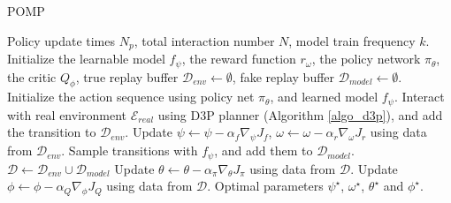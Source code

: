 \documentclass{article} %
\begin{document}
\begin{algorithm}[!thb]
\caption{POMP}
\label{algo_pomp}
\begin{algorithmic}[1]
    \REQUIRE Policy update times $N_p$, total interaction number $N$, model train frequency $k$.
    \STATE  Initialize the learnable model $f_\psi$, the reward function $r_{\omega}$, the policy network $\pi_\theta$, the critic $Q_{\phi}$, true replay buffer $\mathcal{D}_\textit{env} \leftarrow \emptyset$, fake replay buffer $\mathcal{D}_\textit{model} \leftarrow \emptyset$.
        \STATE Initialize the action sequence  using policy net $\pi_\theta$, and learned model $f_\psi$.
        \STATE Interact with real environment $\mathcal{E}_\textit{real}$ using D3P planner (Algorithm \ref{algo_d3p}), and add the transition
        to $\mathcal{D}_\textit{env}$.
        \REPEAT 
        \STATE Update $\psi \leftarrow \psi - \alpha_f \nabla_\psi J_f$, $\omega \leftarrow \omega - \alpha_r \nabla_\omega J_r$ using data from $\mathcal{D}_\textit{env} $.
        \ENDIF
        \STATE Sample transitions with $f_\psi$, and add them to $\mathcal{D}_\textit{model}$.
        \STATE $\mathcal{D} \leftarrow \mathcal{D}_\textit{env}   \cup \mathcal{D}_\textit{model}$
    \STATE Update $\theta \leftarrow \theta - \alpha_\pi \nabla_\theta J_\pi   $ using data from $\mathcal{D}$.
    \STATE Update $\phi \leftarrow \phi - \alpha_Q \nabla_\phi J_Q$ using data from $\mathcal{D}$.
    \ENDFOR 
    \ENDFOR
    \RETURN Optimal parameters $\psi^\star$, $\omega^\star$, $\theta^\star$ and $\phi^\star$.
\end{algorithmic}
\end{algorithm}
\end{document}

